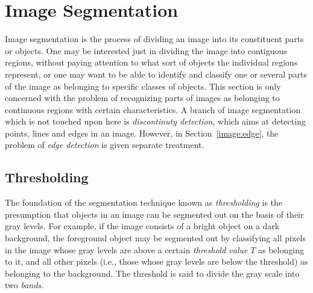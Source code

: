
\section{Image Segmentation}
\label{image:segment}

Image segmentation is the process of dividing an image into its
constituent parts or objects.  One may be interested just in dividing
the image into contiguous regions, without paying attention to what
sort of objects the individual regions represent, or one may want to
be able to identify and classify one or several parts of the image as
belonging to specific classes of objects.  This section is only
concerned with the problem of recognizing parts of images as belonging
to continuous regions with certain characteristics.  A branch of image
segmentation which is not touched upon here is {\em discontinuty
  detection\/}, which aims at detecting points, lines and edges in an
image.  However, in Section~\ref{image:edge}, the problem of {\em edge
  detection\/} is given separate treatment.

\subsection{Thresholding}
\label{image:segment:threshold}

The foundation of the segmentation technique known as {\em
  thresholding\/} is the presumption that objects in an image can be 
segmented out on the basis of their gray levels.  For example, if the 
image consists of a bright object on a dark background, the foreground 
object may be segmented out by classifying all pixels in the image 
whose gray levels are above a certain {\em threshold value\/} $T$ as 
belonging to it, and all other pixels (i.e., those whose gray levels 
are below the threshold) as belonging to the background.  The 
threshold is said to divide the gray scale into two {\em bands\/}.

